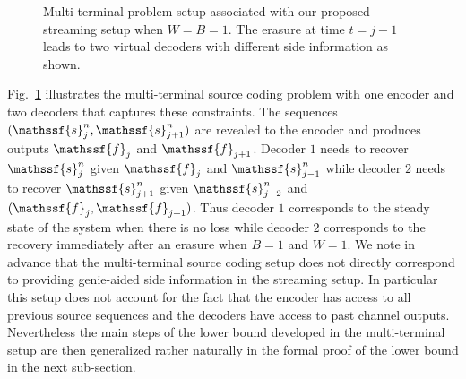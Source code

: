 \documentclass[journal, twocolumn, 10pt]{IEEEtran}
\newcommand{\rvf}{{\mathssf{f}}}    %
\newcommand{\rvs}{{\mathssf{s}}}    %
\begin{document}
\begin{figure}
\begin{center}
\caption{Multi-terminal problem setup associated with our proposed streaming setup when $W=B=1$. The erasure at time $t=j-1$ leads to two virtual decoders with different side information as shown.}
\label{fig:multiterminal}
\end{center}
\end{figure}

Fig.~\ref{fig:multiterminal} illustrates the multi-terminal source coding problem with one encoder and two  decoders that  captures these constraints.  The sequences $(\rvs_{j}^n, \rvs_{j+1}^n)$ are revealed to the encoder and produces outputs $\rvf_{j}$ and $\rvf_{j+1}$.
Decoder $1$  needs to recover $\rvs_{j}^n$ given $\rvf_{j}$ and $\rvs_{j-1}^n$ while decoder $2$ needs to recover $\rvs_{j+1}^n$
given $\rvs_{j-2}^n$ and $(\rvf_{j}, \rvf_{j+1})$. Thus decoder $1$ corresponds to the steady state  of the system when there is no loss while decoder $2$ corresponds to the recovery immediately after an erasure when $B=1$ and $W=1$. 
We note in advance that the multi-terminal source coding setup does not directly correspond to providing genie-aided side information in the streaming setup. In particular this setup does not account for the fact that the encoder has access to all previous source sequences and the decoders have access to past channel outputs. Nevertheless the main steps of the lower bound developed in the multi-terminal setup are then generalized rather naturally in the formal proof of the lower bound in the next sub-section.
\end{document}
